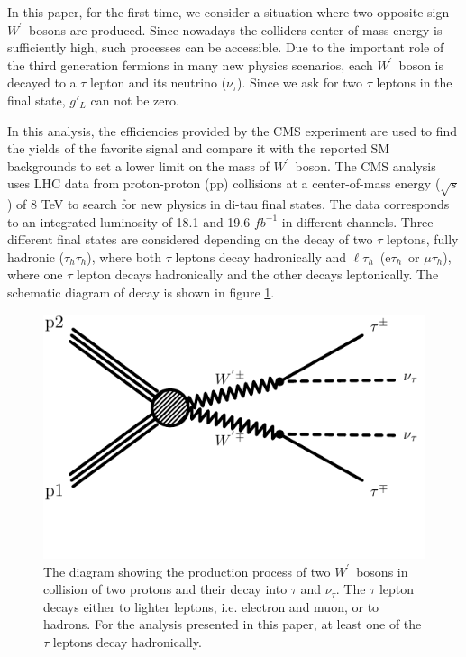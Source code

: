 \documentclass[preprint,showpacs,preprintnumbers]{revtex4}
\newcommand{\wprime}{\ensuremath{W^\prime}~}
\newcommand{\Tau}{\ensuremath{\tau_h}}
\newcommand{\tauTau}{\ensuremath{\tau_h\tau_h}}
\newcommand{\lepTau}{\ensuremath{\ell\tau_h}}
\begin{document}
In this paper, for the first time, we consider a situation where two opposite-sign \wprime bosons are produced. Since nowadays the colliders center of mass energy is sufficiently high, such processes can be accessible. Due to the important role of the third generation fermions in many new physics scenarios, each \wprime boson is decayed to a $\tau$ lepton and its neutrino ($\nu_{\tau}$). Since we ask for two $\tau$ leptons in the final state, $g'_L$ can not be zero. 

In this analysis, the efficiencies provided by the CMS experiment \cite{Khachatryan:2016trj} are used to find the yields of the favorite signal and compare it with the reported SM backgrounds to set a lower limit on the mass of \wprime boson. 
The CMS analysis uses LHC data from proton-proton (pp) collisions at a center-of-mass energy ($\sqrt{s}$) of 8 TeV to search for new physics in di-tau final states.  The data corresponds to an integrated luminosity of 18.1 and 19.6 $fb^{-1}$ in different channels. Three different final states are considered depending on the decay of two $\tau$ leptons, fully hadronic (\tauTau), where both $\tau$ leptons decay hadronically and \lepTau  ~(e\Tau ~or $\mu\Tau$), where one $\tau$ lepton decays hadronically and the other decays leptonically. The schematic diagram of decay is shown in figure \ref{fig:wprimefeyndiagram}.
\begin{figure}[!htb]
	\includegraphics*[width=.45\textwidth]{WpWpTauTau.pdf}
	\caption{The diagram showing the production process of two \wprime bosons in collision of two protons and their decay into $\tau$ and $\nu_{\tau}$. The $\tau$ lepton decays either to lighter leptons, i.e. electron and muon, or to hadrons. For the analysis presented in this paper, at least one of the $\tau$ leptons decay hadronically.}
	\label{fig:wprimefeyndiagram}
\end{figure}
\end{document}
